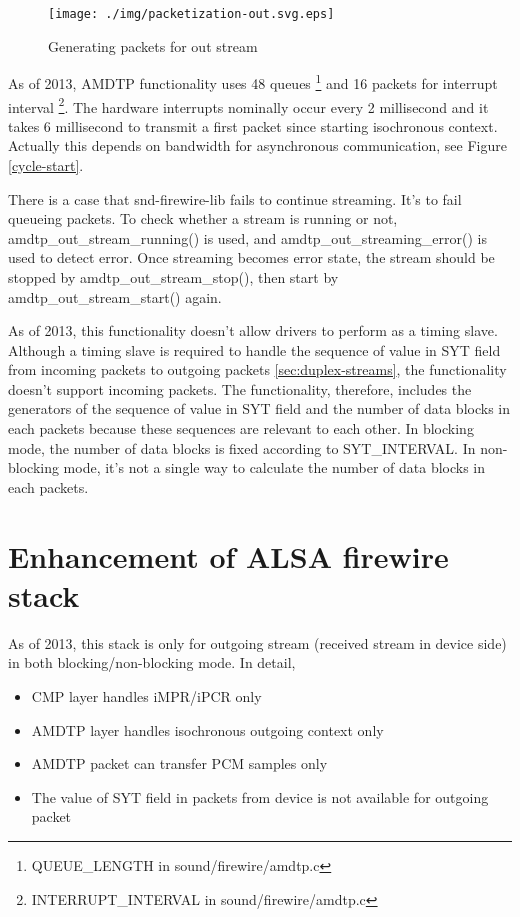 \documentclass[onecolumn]{article}
\begin{document}
\begin{figure}[H]
	\centering
	\texttt{[image: ./img/packetization-out.svg.eps]}
	\caption{{Generating packets for out stream}}
	\label{fig:packetization-out}
\end{figure}

As of 2013, AMDTP functionality uses 48 queues \footnote{QUEUE\_LENGTH in sound/firewire/amdtp.c} and 16 packets for interrupt interval \footnote{INTERRUPT\_INTERVAL in sound/firewire/amdtp.c}. The hardware interrupts nominally occur every 2 millisecond and it takes 6 millisecond to transmit a first packet since starting isochronous context. Actually this depends on bandwidth for asynchronous communication, see Figure \ref{cycle-start}.

There is a case that snd-firewire-lib fails to continue streaming. It's to fail queueing packets. To check whether a stream is running or not, amdtp\_out\_stream\_running() is used, and amdtp\_out\_streaming\_error() is used to detect error. Once streaming becomes error state, the stream should be stopped by amdtp\_out\_stream\_stop(), then start by amdtp\_out\_stream\_start() again.

As of 2013, this functionality doesn't allow drivers to perform as a timing slave. Although a timing slave is required to handle the sequence of value in SYT field from incoming packets to outgoing packets \ref{sec:duplex-streams}, the functionality doesn't support incoming packets. The functionality, therefore, includes the generators of the sequence of value in SYT field and the number of data blocks in each packets because these sequences are relevant to each other. In blocking mode, the number of data blocks is fixed according to SYT\_INTERVAL. In non-blocking mode, it's not a single way to calculate the number of data blocks in each packets\cite{iec61883-6-1, iec61883-6-2}.

\section{Enhancement of ALSA firewire stack}

As of 2013, this stack is only for outgoing stream (received stream in device side) in both blocking/non-blocking mode. In detail,
\begin{itemize}
\item CMP layer handles iMPR/iPCR only
\item AMDTP layer handles isochronous outgoing context only
\item AMDTP packet can transfer PCM samples only
\item The value of SYT field in packets from device is not available for outgoing packet
\end{itemize}
\end{document}
